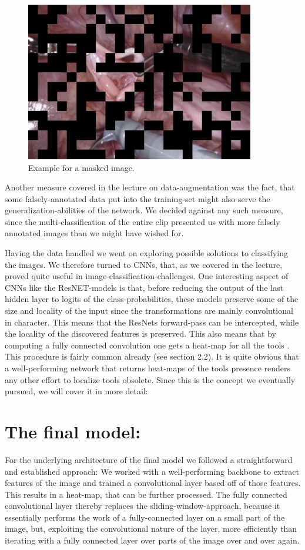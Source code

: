 \begin{figure}
	\centering
	\includegraphics[width=10cm]{3_methodology/masked}
	\caption{Example for a masked image.}
	\label{fig:Masked}
\end{figure}


Another measure covered in the lecture on data-augmentation was the fact, that some falsely-annotated data put into the training-set might also serve the generalization-abilities of the network. We decided against any such measure, since the multi-classification of the entire clip presented us with more falsely annotated images than we might have wished for.

Having the data handled we went on exploring possible solutions to classifying the images. We therefore turned to CNNs, that, as we covered in the lecture, proved quite useful in image-classification-challenges. One interesting aspect of CNNs like the ResNET-models is that, before reducing the output of the last hidden layer to logits of the class-probabilities, these models preserve some of the size and locality of the input since the transformations are mainly convolutional in character. This means that the ResNets forward-pass can be intercepted, while the locality of the discovered features is preserved.
This also means that by computing a fully connected convolution one gets a heat-map for all the tools \citep{classpeak}. This procedure is fairly common already (see section 2.2). It is quite obvious that a well-performing network that returns heat-maps of the tools presence renders any other effort to localize tools obsolete. Since this is the concept we eventually pursued, we will cover it in more detail:

\section{The final model:}
For the underlying architecture of the final model we followed a straightforward and established approach: We worked with a well-performing backbone to extract features of the image and trained a convolutional layer based off of those features. This results in a heat-map, that can be further processed.
The fully connected convolutional layer thereby replaces the sliding-window-approach, because it essentially performs the work of a fully-connected layer on a small part of the image, but, exploiting the convolutional nature of the layer, more efficiently than iterating with a fully connected layer over parts of the image over and over again. 


